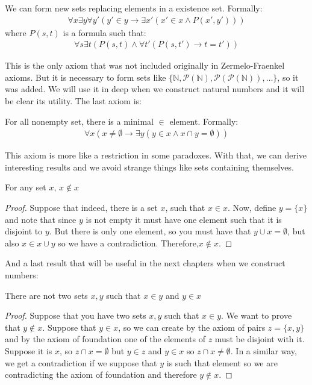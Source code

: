 \documentclass{tufte-handout}
\begin{document}
\begin{axiom}
	We can form new sets replacing elements in a existence set. Formally:
	\begin{align*}
		\forall x \exists y \forall y'(y' \in y \rightarrow \exists x'(x' \in x \wedge P(x', y')))
	\end{align*}
	where $P(s, t)$ is a formula such that:
	\begin{align*}
		\forall s \exists t(P(s, t) \wedge \forall t'(P(s, t') \rightarrow t = t'))
	\end{align*}
\end{axiom}

This is the only axiom that was not included originally in Zermelo-Fraenkel axioms. But it is necessary to form sets like $\{\mathbb{N}, \mathcal{P}(\mathbb{N}), \mathcal{P}(\mathcal{P}(\mathbb{N})), \dots\}$, so it was added. We will use it in deep when we construct natural numbers and it will be clear its utility. The last axiom is:
\begin{axiom}
	For all nonempty set, there is a minimal $\in$ element. Formally:
	\begin{align*}
		\forall x(x \neq \emptyset \rightarrow \exists y(y \in x \wedge x \cap y = \emptyset))
	\end{align*}
\end{axiom}

This axiom is more like a restriction in some paradoxes. With that, we can derive interesting results and we avoid strange things like sets containing themselves.
\begin{theorem}
	For any set $x$, $x \not \in x$
\end{theorem}
\begin{proof}
	Suppose that indeed, there is a set $x$, such that $x \in x$. Now, define $y = \{x\}$ and note that since $y$ is not empty it must have one element such that it is disjoint to $y$. But there is only one element, so you must have that $y \cup x = \emptyset$, but also $x \in x \cup y$ so we have a contradiction. Therefore,$x \not \in x$. 
\end{proof}

And a last result that will be useful in the next chapters when we construct numbers:
\begin{theorem}
	There are not two sets $x, y$ such that $x \in y$ and $y \in x$
\end{theorem}
\begin{proof}
	Suppose that you have two sets $x, y$ such that $x \in y$. We want to prove that $y \not \in x$. Suppose that $y \in x$, so we can create by the axiom of pairs $z = \{x, y\}$ and by the axiom of foundation one of the elements of $z$ must be disjoint with it. Suppose it is $x$, so $z \cap x = \emptyset$ but $y \in z$ and $y \in x$ so $z \cap x \neq \emptyset$. In a similar way, we get a contradiction if we suppose that $y$ is such that element so we are contradicting the axiom of foundation and therefore $y \not\in x$.
\end{proof}
\end{document}
